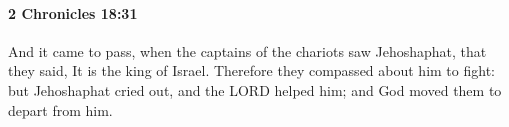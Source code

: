 
		\paragraph{2 Chronicles 18:31} %
			\label{2CHRONICLES-18-31}

			And it came to pass, when the captains of the chariots saw Jehoshaphat, that they said, It is the king of Israel. Therefore they compassed about him to fight: but Jehoshaphat cried out, and the LORD helped him; and God moved them to depart from him.


